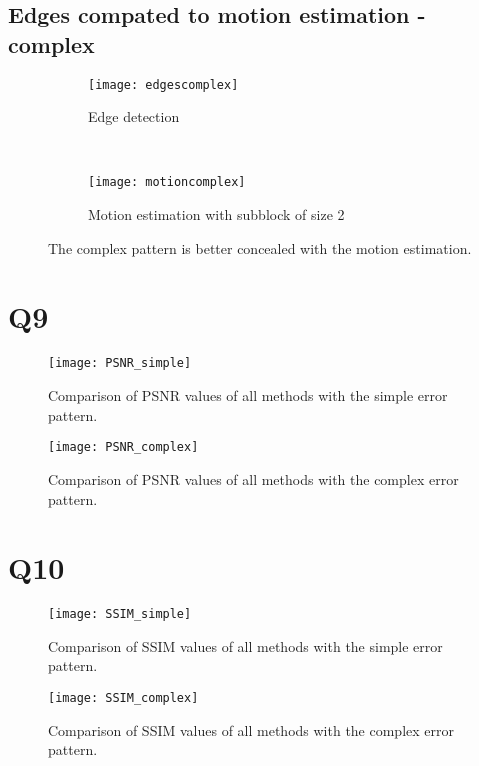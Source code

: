 \begin{appendices}
\clearpage

\subsection{Edges compated to motion estimation - complex}
\begin{figure}[ht]
\centering
\begin{subfigure}{\textwidth}
  \centering
  \texttt{[image: edgescomplex]}
  \caption{Edge detection}
\end{subfigure}\\
\begin{subfigure}{\textwidth}
  \centering
  \texttt{[image: motioncomplex]}
  \caption{Motion estimation with subblock of size 2}
\end{subfigure}
\caption{The complex pattern is better concealed with the motion estimation.}
\label{Q7:edgemotioncomplex}
\end{figure}

\newpage

\section{Q9}\label{app:Q9}
\begin{figure}[!h]\label{fig:PSNR_simple_pattern}
  \centering
  \texttt{[image: PSNR\_simple]}
  \caption{Comparison of PSNR values of all methods with the simple error pattern.} 
\end{figure}
\begin{figure}[!h]\label{fig:PSNR_complex_pattern}
  \centering
  \texttt{[image: PSNR\_complex]}
  \caption{Comparison of PSNR values of all methods with the complex error pattern.} 
\end{figure}

\newpage

\section{Q10}\label{app:Q10}
\begin{figure}[!h]\label{fig:SSIM_simple_pattern}
  \centering
  \texttt{[image: SSIM\_simple]}
  \caption{Comparison of SSIM values of all methods with the simple error pattern.} 
\end{figure}

\begin{figure}[!h]\label{fig:SSIM_complex_pattern}
  \centering
  \texttt{[image: SSIM\_complex]}
  \caption{Comparison of SSIM values of all methods with the complex error pattern.} 
\end{figure}

\end{appendices}